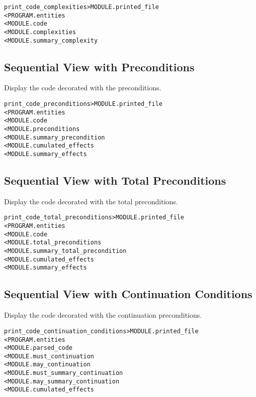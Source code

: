 \documentclass[a4paper]{report}
\newenvironment{PipsMake}{\begin{alltt}}{\end{alltt}}
\begin{document}
\begin{PipsMake}
print_code_complexities         > MODULE.printed_file
        < PROGRAM.entities
        < MODULE.code
        < MODULE.complexities
        < MODULE.summary_complexity
\end{PipsMake}

\subsection{Sequential View with Preconditions}

Display the code decorated with the preconditions.

\begin{PipsMake}
print_code_preconditions        > MODULE.printed_file
        < PROGRAM.entities
        < MODULE.code
        < MODULE.preconditions
        < MODULE.summary_precondition
        < MODULE.cumulated_effects
        < MODULE.summary_effects
\end{PipsMake}

\subsection{Sequential View with Total Preconditions}

Display the code decorated with the total preconditions.

\begin{PipsMake}
print_code_total_preconditions        > MODULE.printed_file
        < PROGRAM.entities
        < MODULE.code
        < MODULE.total_preconditions
        < MODULE.summary_total_precondition
        < MODULE.cumulated_effects
        < MODULE.summary_effects
\end{PipsMake}

\subsection{Sequential View with Continuation Conditions}

Display the code decorated with the continuation preconditions.

\begin{PipsMake}
print_code_continuation_conditions   > MODULE.printed_file
        < PROGRAM.entities
        < MODULE.parsed_code
        < MODULE.must_continuation
        < MODULE.may_continuation
        < MODULE.must_summary_continuation
        < MODULE.may_summary_continuation
        < MODULE.cumulated_effects
\end{PipsMake}
\end{document}
